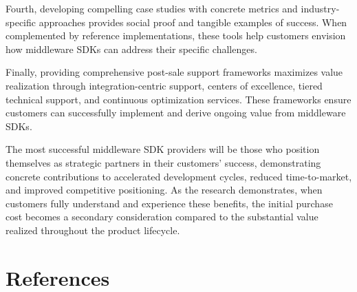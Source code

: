 \documentclass[11pt,a4paper]{article}
\begin{document}
Fourth, developing compelling case studies with concrete metrics and industry-specific approaches provides social proof and tangible examples of success. When complemented by reference implementations, these tools help customers envision how middleware SDKs can address their specific challenges.

Finally, providing comprehensive post-sale support frameworks maximizes value realization through integration-centric support, centers of excellence, tiered technical support, and continuous optimization services. These frameworks ensure customers can successfully implement and derive ongoing value from middleware SDKs.

The most successful middleware SDK providers will be those who position themselves as strategic partners in their customers' success, demonstrating concrete contributions to accelerated development cycles, reduced time-to-market, and improved competitive positioning. As the research demonstrates, when customers fully understand and experience these benefits, the initial purchase cost becomes a secondary consideration compared to the substantial value realized throughout the product lifecycle.

\section*{References}
\end{document}
